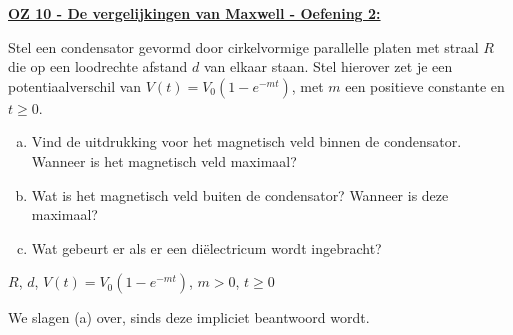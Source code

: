 \textbf{\underline{OZ 10 - De vergelijkingen van Maxwell - Oefening 2:}}
\vspace{0.5cm}

Stel een condensator gevormd door cirkelvormige parallelle platen met straal $R$ die op een loodrechte afstand $d$ van elkaar staan. Stel hierover zet je een potentiaalverschil van $V(t) = V_0 (1 - e^{-mt})$, met $m$ een positieve constante en $t \geq 0$.

\begin{enumerate}[(a)]
    \item Vind de uitdrukking voor het magnetisch veld binnen de condensator. Wanneer is het magnetisch veld maximaal?
    \item Wat is het magnetisch veld buiten de condensator? Wanneer is deze maximaal?
    \item Wat gebeurt er als er een diëlectricum wordt ingebracht?
\end{enumerate}

\begin{description}[labelwidth=1.5cm, leftmargin=!]
    \item[Geg. :]   $R$, $d$, $V(t) = V_0 (1 - e^{-mt})$, $m > 0$, $t \geq 0$
\end{description}

We slagen (a) over, sinds deze impliciet beantwoord wordt.


